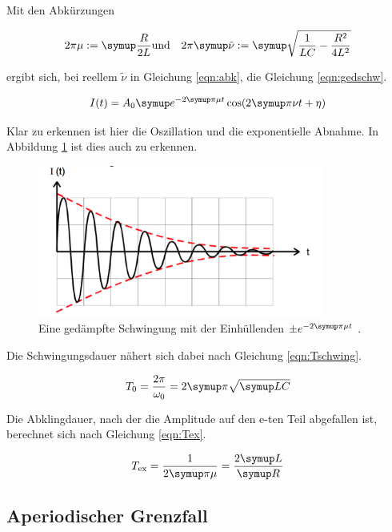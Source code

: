 Mit den Abkürzungen

\begin{align}
  2 \pi \mu := \g{\frac{R}{2 L}} & \text{und} & 2 \pi \g{\tilde{\nu}} := \g{\sqrt{\frac{1}{L C} - \frac{R^2}{4 L^2}}}
  \label{eqn:abk}
\end{align}

ergibt sich, bei reellem $\tilde{\nu}$ in Gleichung \eqref{eqn:abk}, die Gleichung \eqref{eqn:gedschw}.

\begin{equation}
  I(t) = A_0 \g{e}^{-2 \g{\pi} \mu t} \cos(2 \g{\pi} \nu t + \eta)
  \label{eqn:gedschw}
\end{equation}

Klar zu erkennen ist hier die Oszillation und die exponentielle Abnahme.
In Abbildung \ref{fig:gedschw} ist dies auch zu erkennen.

\begin{figure}[h]
  \centering
  \includegraphics[height = 5cm]{gedschw.pdf}
  \caption{Eine gedämpfte Schwingung mit der Einhüllenden $\pm e^{-2\g{\pi}\mu t}$ \cite{anleitung}.}
  \label{fig:gedschw}
\end{figure}

Die Schwingungsdauer nähert sich dabei nach Gleichung \eqref{eqn:Tschwing}.

\begin{equation}
  T_{\text{0}} = \frac{2 \pi}{\omega_0} = 2 \g{\pi}\sqrt{\g{LC}}
  \label{eqn:Tschwing}
\end{equation}

Die Abklingdauer, nach der die Amplitude auf den e-ten Teil abgefallen ist,
berechnet sich nach Gleichung \eqref{eqn:Tex}.

\begin{equation}
  T_{\text{ex}} = \frac{1}{2\g{\pi}\mu} = \frac{2\g{L}}{\g{R}}
  \label{eqn:Tex}
\end{equation}

\subsection{Aperiodischer Grenzfall}


